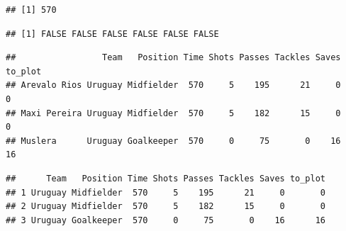 \documentclass[]{book}
\makeatletter
\newenvironment{Shaded}{\begin{snugshade}}{\end{snugshade}}
\newcommand{\KeywordTok}[1]{\textcolor[rgb]{0.13,0.29,0.53}{\textbf{{#1}}}}
\newcommand{\StringTok}[1]{\textcolor[rgb]{0.31,0.60,0.02}{{#1}}}
\newcommand{\NormalTok}[1]{{#1}}
\newenvironment{kframe}{%
\medskip{}
\setlength{\fboxsep}{.8em}
 \def\at@end@of@kframe{}%
 \ifinner\ifhmode%
  \def\at@end@of@kframe{\end{minipage}}%
  \begin{minipage}{\columnwidth}%
 \fi\fi%
 \def\FrameCommand##1{\hskip\@totalleftmargin \hskip-\fboxsep
 \colorbox{shadecolor}{##1}\hskip-\fboxsep
     \hskip-\linewidth \hskip-\@totalleftmargin \hskip\columnwidth}%
 \MakeFramed {\advance\hsize-\width
   \@totalleftmargin\z@ \linewidth\hsize
   \@setminipage}}%
 {\par\unskip\endMakeFramed%
 \at@end@of@kframe}
\renewenvironment{Shaded}{\begin{kframe}}{\end{kframe}}
\makeatother
\begin{document}
\begin{Shaded}
\end{Shaded}

\begin{verbatim}
## [1] 570
\end{verbatim}

\begin{Shaded}
\end{Shaded}

\begin{verbatim}
## [1] FALSE FALSE FALSE FALSE FALSE FALSE
\end{verbatim}

\begin{Shaded}
\end{Shaded}

\begin{verbatim}
##                 Team   Position Time Shots Passes Tackles Saves to_plot
## Arevalo Rios Uruguay Midfielder  570     5    195      21     0       0
## Maxi Pereira Uruguay Midfielder  570     5    182      15     0       0
## Muslera      Uruguay Goalkeeper  570     0     75       0    16      16
\end{verbatim}

\begin{Shaded}
\end{Shaded}

\begin{verbatim}
##      Team   Position Time Shots Passes Tackles Saves to_plot
## 1 Uruguay Midfielder  570     5    195      21     0       0
## 2 Uruguay Midfielder  570     5    182      15     0       0
## 3 Uruguay Goalkeeper  570     0     75       0    16      16
\end{verbatim}
\end{document}
